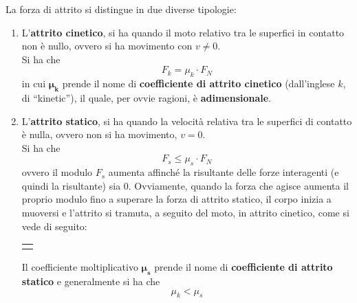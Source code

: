 \documentclass[a4paper]{extarticle}
\newcommand{\quotes}[1]{``#1''}
\begin{document}
\vspace{1em}
\noindent
La forza di attrito si distingue in due diverse tipologie:
\begin{enumerate}
  \item L'\textbf{attrito cinetico}, si ha quando il moto relativo tra le superfici in contatto non è nullo, ovvero si ha movimento con $v \neq 0$.\\
  Si ha che
  \[\boxed{F_k = \mu_k \cdot F_N}\]
  in cui $\boldsymbol{\mu_k}$ prende il nome di \textbf{coefficiente di attrito cinetico} (dall'inglese $k$, di \quotes{kinetic}), il quale, per ovvie ragioni, è \textbf{adimensionale}.

  \item L'\textbf{attrito statico}, si ha quando la velocità relativa tra le superfici di contatto è nulla, ovvero non si ha movimento, $v = 0$.\\
  Si ha che
  \[\boxed{F_s \leq \mu_s \cdot F_N}\]
  ovvero il modulo $F_s$ aumenta affinché la risultante delle forze interagenti (e quindi la risultante) sia $0$. Ovviamente, quando la forza che agisce aumenta il proprio modulo fino a superare la forza di attrito statico, il corpo inizia a muoversi e l'attrito si tramuta, a seguito del moto, in attrito cinetico, come si vede di seguito:

  \vspace{2em}
  \noindent
  \begin{tabularx}{\textwidth}{P}
    {
        \centering
    }
  \end{tabularx}

  \vspace{1em}
  \noindent
  Il coefficiente moltiplicativo $\boldsymbol{\mu_s}$ prende il nome di \textbf{coefficiente di attrito statico} e generalmente si ha che
  \[\boxed{\mu_k < \mu_s}\]
\end{enumerate}
\end{document}
